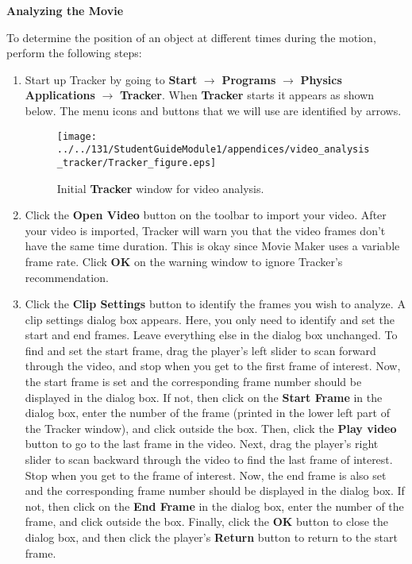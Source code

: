 \textbf{Analyzing the Movie} 

To determine the position of an object at different times during the
motion, perform the following steps:

\begin{enumerate}

\item Start up Tracker by going to {\bf Start} $\rightarrow$ {\bf Programs} $\rightarrow$ {\bf Physics Applications} $\rightarrow$ {\bf Tracker}. 
When {\bf Tracker} starts it appears as shown below. The menu icons and buttons that we will use are identified by arrows.
\begin{figure}[hbt]
\begin{center}
\texttt{[image: ../../131/StudentGuideModule1/appendices/video\_analysis\_tracker/Tracker\_figure.eps]}
\caption{Initial {\bf Tracker} window for video analysis.}
\end{center}
\end{figure}

\item Click the {\bf Open Video} button on the toolbar to import your video. 
After your video is imported, Tracker will warn you that the video frames 
don't have the same time duration. 
This is okay since Movie Maker uses a variable frame rate. 
Click {\bf OK} on the warning window to ignore Tracker's recommendation.

\item Click the {\bf Clip Settings} button to identify the frames you wish to analyze. 
A clip settings dialog box appears. 
Here, you only need to identify and set the start and end frames. 
Leave everything else in the dialog box unchanged. 
To find and set the start frame, drag the player's left slider to scan forward through the video, and 
stop when you get to the first frame of interest. 
Now, the start frame is set and the corresponding frame number should be displayed in the dialog box. 
If not, then click on the {\bf Start Frame} in the dialog box, enter the number of the frame 
(printed in the lower left part of the Tracker window), and click outside the box.
Then, click the {\bf Play video} button to go to the last frame in the video. 
Next, drag the player's right slider to scan backward through the video to find the last frame of interest. 
Stop when you get to the frame of interest. Now, the end frame is also set and the corresponding frame number should be displayed in the dialog box. 
If not, then click on the {\bf End Frame} in the dialog box, enter the number of the frame, and click outside the box.
Finally, click the {\bf OK} button to close the dialog box, and then click the player's {\bf Return} button to return to the start frame.


\end{enumerate}

